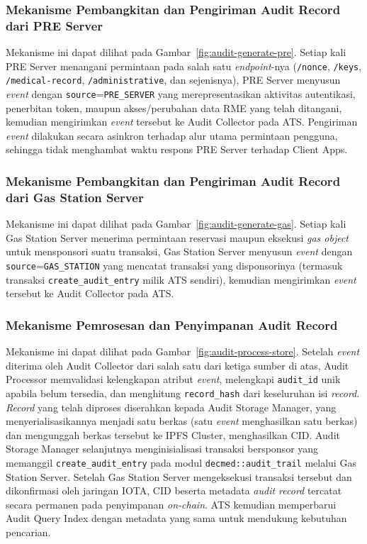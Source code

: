 \subsubsection{Mekanisme Pembangkitan dan Pengiriman Audit Record dari PRE Server}
Mekanisme ini dapat dilihat pada Gambar~\ref{fig:audit-generate-pre}.
Setiap kali PRE Server menangani permintaan pada salah satu \textit{endpoint}-nya
(\texttt{/nonce}, \texttt{/keys}, \texttt{/medical-record}, \texttt{/administrative},
dan sejenisnya), PRE Server menyusun \textit{event} dengan
\texttt{source}=\texttt{PRE\_SERVER} yang merepresentasikan aktivitas
autentikasi, penerbitan token, maupun akses/perubahan data RME yang telah
ditangani, kemudian mengirimkan \textit{event} tersebut ke Audit Collector
pada ATS. Pengiriman \textit{event} dilakukan secara asinkron terhadap alur
utama permintaan pengguna, sehingga tidak menghambat waktu respons PRE
Server terhadap Client Apps.

\subsubsection{Mekanisme Pembangkitan dan Pengiriman Audit Record dari Gas Station Server}
Mekanisme ini dapat dilihat pada Gambar~\ref{fig:audit-generate-gas}.
Setiap kali Gas Station Server menerima permintaan reservasi maupun eksekusi
\textit{gas object} untuk mensponsori suatu transaksi, Gas Station Server
menyusun \textit{event} dengan \texttt{source}=\texttt{GAS\_STATION} yang
mencatat transaksi yang disponsorinya (termasuk transaksi
\texttt{create\_audit\_entry} milik ATS sendiri), kemudian mengirimkan
\textit{event} tersebut ke Audit Collector pada ATS.

\subsubsection{Mekanisme Pemrosesan dan Penyimpanan Audit Record}
Mekanisme ini dapat dilihat pada Gambar~\ref{fig:audit-process-store}.
Setelah \textit{event} diterima oleh Audit Collector dari salah satu dari
ketiga sumber di atas, Audit Processor memvalidasi kelengkapan atribut
\textit{event}, melengkapi \texttt{audit\_id} unik apabila belum tersedia,
dan menghitung \texttt{record\_hash} dari keseluruhan isi \textit{record}.
\textit{Record} yang telah diproses diserahkan kepada Audit Storage Manager,
yang menyerialisasikannya menjadi satu berkas (satu \textit{event}
menghasilkan satu berkas) dan mengunggah berkas tersebut ke IPFS Cluster,
menghasilkan CID. Audit Storage Manager selanjutnya menginisialisasi
transaksi bersponsor yang memanggil \texttt{create\_audit\_entry} pada modul
\texttt{decmed::audit\_trail} melalui Gas Station Server. Setelah Gas
Station Server mengeksekusi transaksi tersebut dan dikonfirmasi oleh
jaringan IOTA, CID beserta metadata \textit{audit record} tercatat secara
permanen pada penyimpanan \textit{on-chain}. ATS kemudian memperbarui Audit
Query Index dengan metadata yang sama untuk mendukung kebutuhan pencarian.

